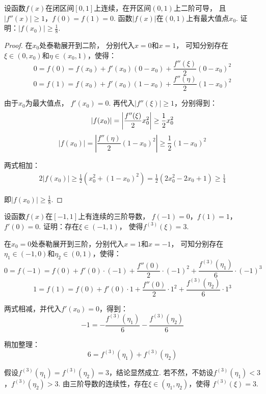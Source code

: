 \begin{example}
\label{ex:ch04-38}
设函数$f(x)$在闭区间$[0,1]$上连续，在开区间$(0,1)$上二阶可导，
且$|f''(x)| \ge 1$，$f(0) = f(1) = 0$.
函数$|f(x)|$在$(0,1)$上有最大值点$x_0$.
证明：$|f(x_0)| \ge \frac{1}{8}$.
\end{example}

\begin{proof}
在$x_0$处泰勒展开到二阶，
分别代入$x = 0$和$ x= 1$，
可知分别存在$\xi \in (0,x_0)$和$\eta \in (x_0,1)$，使得：
$$
0=f(0) = f(x_0) + f'(x_0) (0-x_0) + \frac{f''(\xi)}{2} (0-x_0)^2
$$
$$
0=f(1) = f(x_0) + f'(x_0) (1-x_0) + \frac{f''(\eta)}{2} (1-x_0)^2
$$\par
由于$x_0$为最大值点，
$f'(x_0) = 0$.
再代入$|f''(\xi)| \ge 1$，分别得到：
$$
|f(x_0)| = \left| \frac{f''(\xi)}{2}x_0^2 \right| \ge \frac{1}{2}x_0^2  \\
$$
$$
|f(x_0)| = \left| \frac{f''(\eta)}{2}(1-x_0)^2 \right| \ge \frac{1}{2}(1-x_0)^2
$$

两式相加：
\begin{equation}
    \begin{aligned}
        2|f(x_0)|
        \ge \frac{1}{2} \left( x_0^2 +(1-x_0)^2 \right)
        = \frac{1}{2} \left( 2x_0^2 - 2x_0 + 1 \right)
        \ge \frac{1}{4}
        \nonumber
    \end{aligned}
\end{equation}

即$|f(x_0)| \ge \frac{1}{8}$.
\end{proof}

\begin{example}
\label{ex:ch04-39}
设函数$f(x)$在$[-1,1]$上有连续的三阶导数，
$f(-1) = 0$，$f(1) = 1$，
$f'(0) = 0$.
证明：存在$\xi \in (-1,1)$，
使得$f^{(3)}(\xi) = 3$.
\end{example}

\begin{solution}
在$x_0 = 0$处泰勒展开到三阶，分别代入$x = 1$和$x = -1$，
可知分别存在$\eta_1 \in (-1,0)$和$\eta_2 \in (0,1)$，使得：
$$
0=f(-1) = f(0) + f'(0) \cdot (-1) + \frac{f''(0)}{2} \cdot (-1)^2 + \frac{f^{(3)}(\eta_1)}{6} \cdot (-1)^3
$$
$$
1=f(1) = f(0) + f'(0)\cdot 1 + \frac{f''(0)}{2} \cdot 1^2 + \frac{f^{(3)}(\eta_2)}{6}  \cdot 1^3
$$\par
两式相减，并代入$f'(x_0) = 0$，得到：
$$
-1 = -\frac{f^{(3)}(\eta_1)}{6} - \frac{f^{(3)}(\eta_2)}{6}
$$\par
稍加整理：
$$
6 = f^{(3)}(\eta_1) + f^{(3)}(\eta_2)
$$\par
假设$f^{(3)}(\eta_1)=f^{(3)}(\eta_2)=3$，结论显然成立.
若不然，不妨设$f^{(3)}(\eta_1) < 3$，$f^{(3)}(\eta_2)>3$.
由三阶导数的连续性，存在$\xi \in (\eta_1,\eta_2)$，使得
$f^{(3)}(\xi) = 3$.
\end{solution}


